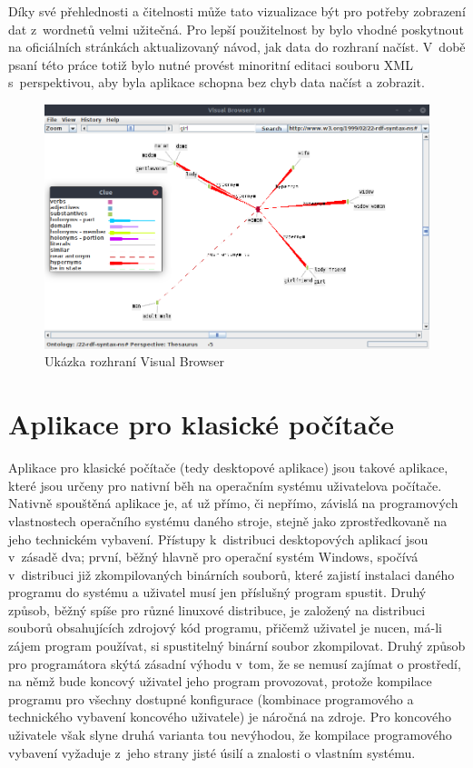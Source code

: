 \documentclass[a4paper,11pt,openany,twoside]{book}
\begin{document}
					Díky své přehlednosti a čitelnosti může tato vizualizace být pro potřeby zobrazení dat z~wordnetů velmi užitečná. Pro lepší použitelnost by bylo vhodné poskytnout na oficiálních stránkách aktualizovaný návod, jak data do rozhraní načíst. V~době psaní této práce totiž bylo nutné provést minoritní editaci souboru XML s~perspektivou, aby byla aplikace schopna bez chyb data načíst a zobrazit.

					\begin{figure}[h]
						\centering
						\includegraphics[width=1.0\textwidth]{visualbrowser.png}
						\caption{Ukázka rozhraní Visual Browser}
						\label{fig:visualbrowser}
					\end{figure} 

			\section{Aplikace pro klasické počítače}

			Aplikace pro klasické počítače (tedy desktopové aplikace) jsou takové aplikace, které jsou určeny pro nativní běh na operačním systému uživatelova počítače. Nativně spouštěná aplikace je, ať už přímo, či nepřímo, závislá na programových vlastnostech operačního systému daného stroje, stejně jako zprostředkovaně na jeho technickém vybavení. Přístupy k~distribuci desktopových aplikací jsou v~zásadě dva; první, běžný hlavně pro operační systém Windows, spočívá v~distribuci již zkompilovaných binárních souborů, které zajistí instalaci daného programu do systému a uživatel musí jen příslušný program spustit. Druhý způsob, běžný spíše pro různé linuxové distribuce, je založený na distribuci souborů obsahujících zdrojový kód programu, přičemž uživatel je nucen, má-li zájem program používat, si spustitelný binární soubor zkompilovat. Druhý způsob pro programátora skýtá zásadní výhodu v~tom, že se nemusí zajímat o prostředí, na němž bude koncový uživatel jeho program provozovat, protože kompilace programu pro všechny dostupné konfigurace (kombinace programového a technického vybavení koncového uživatele) je náročná na zdroje. \parencite{Elizabeth2015} Pro koncového uživatele však slyne druhá varianta tou nevýhodou, že kompilace programového vybavení vyžaduje z~jeho strany jisté úsilí a znalosti o vlastním systému. 
\end{document}
